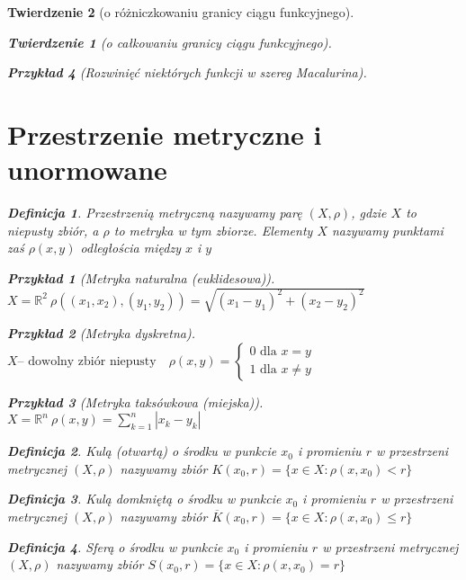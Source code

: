 \documentclass[12pt,a4paper]{article}
\newtheorem{tw}{Twierdzenie}
\newtheorem{przyklad}{Przykład}
\theoremstyle{definition}
\newtheorem{df}{Definicja}
\begin{document}
\begin{tw}[o różniczkowaniu granicy ciągu funkcyjnego]
\begin{tw}[o całkowaniu granicy ciągu funkcyjnego]
\begin{przyklad}[Rozwinięć niektórych funkcji w szereg Macalurina]
\section{Przestrzenie metryczne i unormowane}
\begin{df}
Przestrzenią metryczną nazywamy parę $(X, \rho)$, gdzie $X$ to niepusty zbiór, a $\rho$ to metryka w tym zbiorze. Elementy $X$ nazywamy punktami zaś $\rho (x,y)$ odległościa między $x$ i $y$ 
\end{df}
\begin{przyklad}[Metryka naturalna (euklidesowa)]
$X = \mathbb{R}^2 ~\rho((x_1,x_2),(y_1, y_2)) = \sqrt{(x_1-y_1)^2+(x_2-y_2)^2}$
\end{przyklad}
\begin{przyklad}[Metryka dyskretna]
$X \mbox{-- dowolny zbiór niepusty} \quad \rho(x,y) = 
\begin{cases}
0 \mbox{ dla } x = y\\
1 \mbox{ dla } x \neq y
\end{cases}$
\end{przyklad}
\begin{przyklad}[Metryka taksówkowa (miejska)]
$X = \mathbb{R}^n ~\rho(x, y) = \sum\limits_{k=1}^n |x_k-y_k|$
\end{przyklad}

\begin{df}
Kulą (otwartą) o środku w punkcie $x_0$ i promieniu $r$ w przestrzeni metrycznej $(X, \rho)$ nazywamy zbiór $K(x_0, r) = \{x\in X: \rho(x,x_0) < r\}$
\end{df}
\begin{df}
Kulą domkniętą o środku w punkcie $x_0$ i promieniu $r$ w przestrzeni metrycznej $(X, \rho)$ nazywamy zbiór $\overline{K}(x_0, r) = \{x\in X: \rho(x,x_0) \leqslant r\}$
\end{df}
\begin{df}
Sferą o środku w punkcie $x_0$ i promieniu $r$ w przestrzeni metrycznej $(X, \rho)$ nazywamy zbiór $S(x_0, r) = \{x\in X: \rho(x,x_0) = r\}$
\end{df}


\end{przyklad}
\end{tw}
\end{tw}
\end{document}

